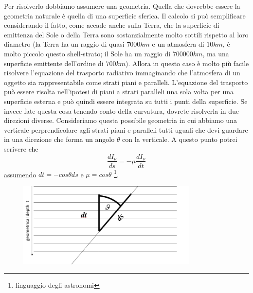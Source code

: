 \documentclass[a4paper,11pt]{article}
\begin{document}
Per risolverlo dobbiamo assumere una geometria. Quella che dovrebbe essere la geometria naturale è quella di una superficie sferica.
\newline
Il calcolo si può semplificare considerando il fatto, come accade anche sulla Terra, che la superficie di emittenza del Sole o della Terra sono sostanzialmente molto sottili rispetto al loro diametro (la Terra ha un raggio di quasi $7000km$ e un atmosfera di $10km$, è molto piccolo questo shell-strato; il Sole ha un raggio di $700000km$, ma una superficie emittente dell'ordine di $700km$). Allora in questo caso è molto più facile risolvere l'equazione del trasporto radiativo immaginando che l'atmosfera di un oggetto sia rappresentabile come strati piani e paralleli. L'equazione del trasporto può essere risolta nell'ipotesi di piani a strati paralleli una sola volta per una superficie esterna e può quindi essere integrata su tutti i punti della superficie.
Se invece fate questa cosa tenendo conto della curvatura, dovrete risolverla in due direzioni diverse.
\newline
Consideriamo questa possibile geometria in cui abbiamo una verticale perprendicolare agli strati piani e paralleli tutti uguali che devi guardare in una direzione che forma un angolo $\theta$ con la verticale.
A questo punto potrei scrivere che 
$$
\frac{dI_{\nu}}{ds}=-\mu\frac{dI_{\nu}}{dt}
$$
assumendo $dt=-cos{\theta}ds$ e $\mu=cos\theta$ \footnote{linguaggio degli astronomi}.
\begin{figure} [h]
    \centering
    \includegraphics[width=9cm]{28-10-15(geometria_risoluzione_equazione_trasporto_radiativo).png}
    \label{fig:geometria_eq_trasporto_radiativo}
\end{figure}
\end{document}
